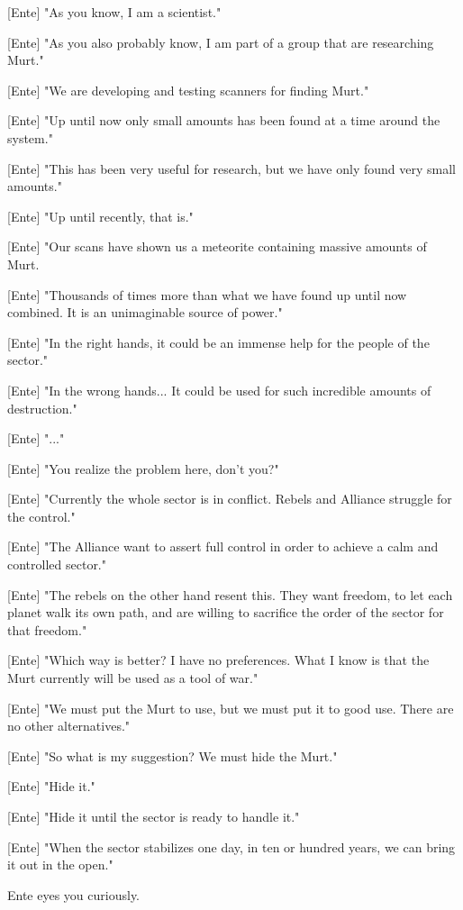 \documentclass[a4paper,12pt]{article}
\begin{document}
[Ente] "As you know, I am a scientist." 

[Ente] "As you also probably know, I am part of a group that are researching Murt."

[Ente] "We are developing and testing scanners for finding Murt."

[Ente] "Up until now only small amounts has been found at a time around the system." 

[Ente] "This has been very useful for research, but we have only found very small amounts."

[Ente] "Up until recently, that is." 

[Ente] "Our scans have shown us a meteorite containing massive amounts of Murt. 

[Ente] "Thousands of times more than what we have found up until now combined. It is an unimaginable source of power."

[Ente] "In the right hands, it could be an immense help for the people of the sector."

[Ente] "In the wrong hands... It could be used for such incredible amounts of destruction."

[Ente] "..."

[Ente] "You realize the problem here, don't you?"

[Ente] "Currently the whole sector is in conflict. Rebels and Alliance struggle for the control."

[Ente] "The Alliance want to assert full control in order to achieve a calm and controlled sector."

[Ente] "The rebels on the other hand resent this. They want freedom, to let each planet walk its own path, and
are willing to sacrifice the order of the sector for that freedom."

[Ente] "Which way is better? I have no preferences. What I know is that the Murt currently will be used as a tool of war."

[Ente] "We must put the Murt to use, but we must put it to good use. There are no other alternatives."

[Ente] "So what is my suggestion? We must hide the Murt." 

[Ente] "Hide it." 

[Ente] "Hide it until the sector is ready to handle it."

[Ente] "When the sector stabilizes one day, in ten or hundred years, we can bring it out in the open."

Ente eyes you curiously.
\end{document}
